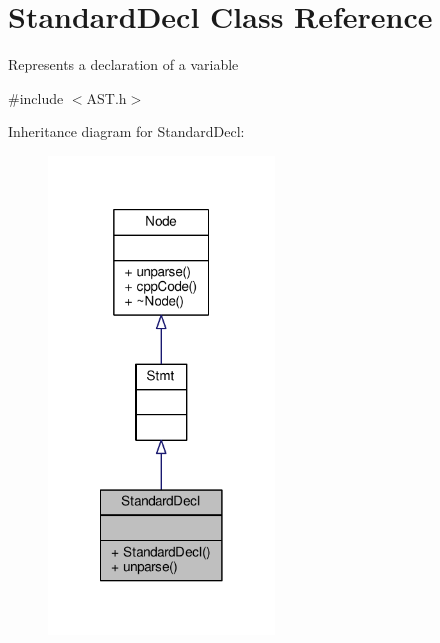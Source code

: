 \hypertarget{classStandardDecl}{\section{Standard\-Decl Class Reference}
\label{classStandardDecl}
}


Represents a declaration of a variable \par
  




{\ttfamily \#include $<$A\-S\-T.\-h$>$}



Inheritance diagram for Standard\-Decl\-:\nopagebreak
\begin{figure}[H]
\begin{center}
\leavevmode
\includegraphics[width=170pt]{classStandardDecl__inherit__graph}
\end{center}
\end{figure}


